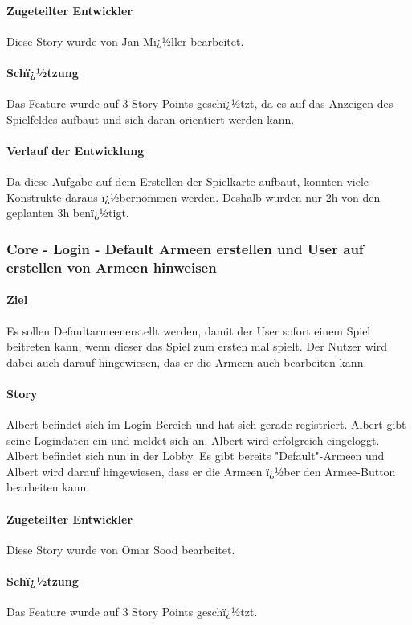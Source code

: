 \documentclass[12pt, titlepage]{scrartcl}
\begin{document}
			\paragraph{Zugeteilter Entwickler} Diese Story wurde von Jan Mï¿½ller bearbeitet.
			\paragraph{Schï¿½tzung}
			Das Feature wurde auf 3 Story Points geschï¿½tzt, da es auf das Anzeigen des Spielfeldes aufbaut und sich daran orientiert werden kann.
			\paragraph{Verlauf der Entwicklung} 
			Da diese Aufgabe auf dem Erstellen der Spielkarte aufbaut, konnten viele Konstrukte daraus ï¿½bernommen werden. Deshalb wurden nur 2h von den geplanten 3h benï¿½tigt.
			
			\subsubsection{Core - Login - Default Armeen erstellen und User auf erstellen von Armeen hinweisen}
			\paragraph{Ziel} Es sollen \glqq Defaultarmeen\grqq erstellt werden, damit der User sofort einem Spiel beitreten kann, wenn dieser das Spiel zum ersten mal spielt. Der Nutzer wird dabei auch darauf hingewiesen, das er die Armeen auch bearbeiten kann.
			\paragraph{Story} Albert befindet sich im Login Bereich und hat sich gerade registriert. Albert gibt seine Logindaten ein und meldet sich an. Albert wird erfolgreich eingeloggt. Albert befindet sich nun in der Lobby. Es gibt bereits  "Default"-Armeen und Albert wird darauf hingewiesen, dass er die Armeen ï¿½ber den Armee-Button bearbeiten kann.
			\paragraph{Zugeteilter Entwickler} Diese Story wurde von Omar Sood bearbeitet.
			\paragraph{Schï¿½tzung}
			Das Feature wurde auf 3 Story Points geschï¿½tzt.
\end{document}
